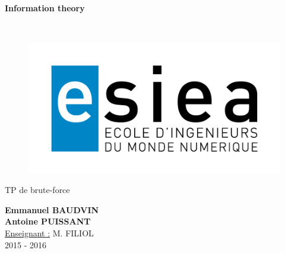 \begin{titlepage}
      \begin{center}   
        \Huge
        \textbf{Information theory}
        
        \LARGE
        ~
        
        
        \vfill
        \begin{figure}[H]
	    \centering
	    \begin{minipage}{0.89\textwidth}
		\centering
		\includegraphics[width=\textwidth]{./img/esiea.jpeg}
	    \end{minipage}
	\end{figure}
        \vfill
        
        \vspace{0.5cm}
        
        TP de brute-force
        
        \vspace{2cm}
        \textbf{Emmanuel BAUDVIN\\Antoine PUISSANT}\\
        \vspace{0.8cm}
        \Large
        \underline{Enseignant :} M. FILIOL\\
        \vspace{0.5cm}
        2015 - 2016%
        
    \end{center}
\end{titlepage}